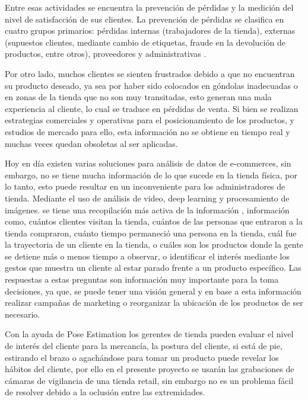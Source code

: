 \documentclass[conference]{IEEEtran}
\begin{document}
Entre esas actividades se encuentra la prevención de pérdidas y la medición del nivel de satisfacción de sus clientes. La prevención de pérdidas se clasifica en cuatro grupos primarios: pérdidas internas (trabajadores de la tienda), externas (supuestos clientes, mediante cambio de etiquetas, fraude en la devolución de productos, entre otros), proveedores y administrativas \cite{deyle2015global}.

Por otro lado, muchos clientes se sienten frustrados debido a que no encuentran su producto deseado, ya sea por haber sido colocados en góndolas inadecuadas o en zonas de la tienda que no son muy transitadas, esto generan una mala experiencia al cliente, lo cual se traduce en pérdidas de venta. Si bien se realizan estrategias comerciales y operativas para el posicionamiento de los productos, y estudios de mercado para ello, esta información no se obtiene en tiempo real y muchas veces quedan obsoletas al ser aplicadas.

Hoy en día existen varias soluciones para análisis de datos de e-commerces, sin embargo, no se tiene mucha información de lo que sucede en la tienda física, por lo tanto, esto puede resultar en un inconveniente para los administradores de tienda. Mediante el uso de análisis de video, deep learning y procesamiento de imágenes. se tiene una recopilación más activa de la información \cite{karim2018customer}, información como, cuántos clientes visitan la tienda, cuántos de las personas que entraron a la tienda compraron, cuánto tiempo permaneció una persona en la tienda, cuál fue la trayectoria de un cliente en la tienda, o cuáles son los productos donde la gente se detiene más o menos tiempo a observar, o identificar el interés mediante los gestos que muestra un cliente al estar parado frente a un producto específico. Las respuestas a estas preguntas son  información muy importante para la toma decisiones, ya que,  se puede tener una visión general y en base a esta información realizar campañas de marketing o reorganizar la ubicación de los productos de ser necesario.

Con la ayuda de Pose Estimation los gerentes de tienda pueden evaluar el nivel de interés del cliente para la mercancía, la postura del cliente, si está de pie, estirando el brazo o agachándose para tomar un producto puede revelar los hábitos del cliente, por ello en el presente proyecto se usarán las grabaciones de cámaras de vigilancia de una tienda retail, sin embargo no es un problema fácil de resolver debido a la oclusión entre las extremidades\cite{liu2018integral}.
\end{document}
